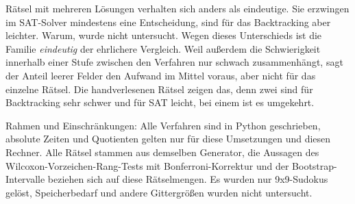 Rätsel mit mehreren Lösungen verhalten sich anders als eindeutige. Sie erzwingen im SAT-Solver mindestens eine Entscheidung, sind für das Backtracking aber leichter. Warum, wurde nicht untersucht. Wegen dieses Unterschieds ist die Familie \emph{eindeutig} der ehrlichere Vergleich. Weil außerdem die Schwierigkeit innerhalb einer Stufe zwischen den Verfahren nur schwach zusammenhängt, sagt der Anteil leerer Felder den Aufwand im Mittel voraus, aber nicht für das einzelne Rätsel. Die handverlesenen Rätsel zeigen das, denn zwei sind für Backtracking sehr schwer und für SAT leicht, bei einem ist es umgekehrt.

Rahmen und Einschränkungen: Alle Verfahren sind in Python geschrieben, absolute Zeiten und Quotienten gelten nur für diese Umsetzungen und diesen Rechner. Alle Rätsel stammen aus demselben Generator, die Aussagen des Wilcoxon-Vorzeichen-Rang-Tests mit Bonferroni-Korrektur und der Bootstrap-Intervalle beziehen sich auf diese Rätselmengen. Es wurden nur 9x9-Sudokus gelöst, Speicherbedarf und andere Gittergrößen wurden nicht untersucht.
